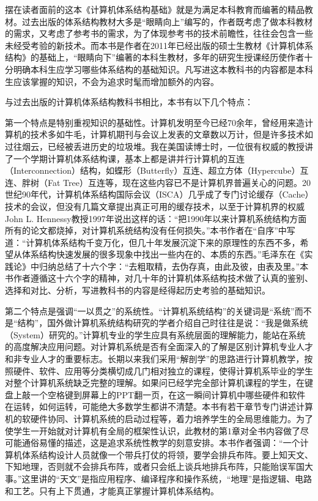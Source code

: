 \documentclass[]{ctexbook}
\begin{document}
摆在读者面前的这本《计算机体系结构基础》就是为满足本科教育而编著的精品教材。过去出版的体系结构教材大多是``眼睛向上''编写的，作者既考虑了做本科教材的需求，又考虑了参考书的需求，为了体现参考书的技术前瞻性，往往会包含一些未经受考验的新技术。而本书是作者在2011年已经出版的硕士生教材《计算机体系结构》的基础上，``眼睛向下''编著的本科生教材，多年的研究生授课经历使作者十分明确本科生应学习哪些体系结构的基础知识。凡写进这本教科书的内容都是本科生应该掌握的知识，不会为追求时髦而增加额外的内容。

与过去出版的计算机体系结构教科书相比，本书有以下几个特点：

第一个特点是特别重视知识的基础性。计算机发明至今已经70余年，曾经用来造计算机的技术多如牛毛，计算机期刊与会议上发表的文章数以万计，但是许多技术如过往烟云，已经被丢进历史的垃圾堆。我在美国读博士时，一位很有权威的教授讲了一个学期计算机体系结构课，基本上都是讲并行计算机的互连（Interconnection）结构，如蝶形（Butterfly）互连、超立方体（Hypercube）互连、胖树（Fat Tree）互连等，现在这些内容已不是计算机界普遍关心的问题。20世纪90年代，计算机体系结构国际会议（ISCA）几乎成了专门讨论缓存（Cache）技术的会议，但没有几篇文章提出真正可用的缓存技术，以至于计算机界的权威John L. Hennessy教授1997年说出这样的话：``把1990年以来计算机系统结构方面所有的论文都烧掉，对计算机系统结构没有任何损失。''本书作者在``自序''中写道：``计算机体系结构千变万化，但几十年发展沉淀下来的原理性的东西不多，希望从体系结构快速发展的很多现象中找出一些内在的、本质的东西。''毛泽东在《实践论》中归纳总结了十六个字：``去粗取精，去伪存真，由此及彼，由表及里。''本书作者遵循这十六个字的精神，对几十年的计算机体系结构技术做了认真的鉴别、选择和对比、分析，写进教科书的内容是经得起历史考验的基础知识。

第二个特点是强调``一以贯之''的系统性。``计算机系统结构''的关键词是``系统''而不是``结构''，国外做计算机系统结构研究的学者介绍自己时往往是说：``我是做系统（System）研究的。''计算机专业的学生应具有系统层面的理解能力，能站在系统的高度解决应用问题。对计算机系统是否有全面深入的了解是区别计算机专业人才和非专业人才的重要标志。长期以来我们采用``解剖学''的思路进行计算机教学，按照硬件、软件、应用等分类横切成几门相对独立的课程，使得计算机系毕业的学生对整个计算机系统缺乏完整的理解。如果问已经学完全部计算机课程的学生，在键盘上敲一个空格键到屏幕上的PPT翻一页，在这一瞬间计算机中哪些硬件和软件在运转，如何运转，可能绝大多数学生都讲不清楚。本书有若干章节专门讲述计算机的软硬件协同、计算机系统的启动过程等，着力培养学生的全局思维能力。为了使学生一开始就对计算机有全局的框架性认识，此教材的第1章对全书内容做了尽可能通俗易懂的描述，这是追求系统性教学的刻意安排。本书作者强调：``一个计算机体系结构设计人员就像一个带兵打仗的将领，要学会排兵布阵。要上知天文、下知地理，否则就不会排兵布阵，或者只会纸上谈兵地排兵布阵，只能贻误军国大事。''这里讲的``天文''是指应用程序、编译程序和操作系统，``地理''是指逻辑、电路和工艺。只有上下贯通，才能真正掌握计算机体系结构。
\end{document}
